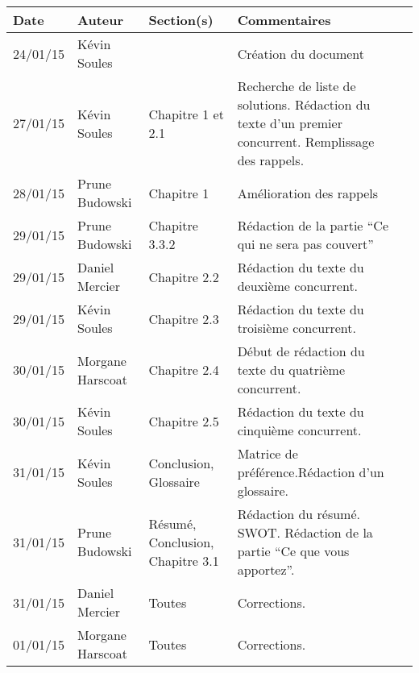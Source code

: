\small
\begin{tabular}{|p{1.5cm}|l|p{2.5cm}|p{7.8cm}|l|}
  \hline
 
   \rowcolor{Gainsboro}Date  & Auteur & Section(s) & Commentaires \\
  \hline
24/01/15 & Kévin Soules &  & Création du document\\
  \hline
27/01/15 & Kévin Soules & Chapitre 1 et 2.1 & Recherche de liste de solutions. Rédaction du texte d'un premier concurrent. Remplissage des rappels.\\
\hline
28/01/15 & Prune Budowski & Chapitre 1 & Amélioration des rappels \\
\hline
29/01/15 & Prune Budowski & Chapitre 3.3.2 & Rédaction de la partie ``Ce qui ne sera pas couvert''\\
\hline
29/01/15 & Daniel Mercier & Chapitre 2.2 & Rédaction du texte du deuxième concurrent.\\
\hline
29/01/15 & Kévin Soules & Chapitre 2.3 & Rédaction du texte du troisième concurrent. \\
\hline
30/01/15 & Morgane Harscoat & Chapitre 2.4 & Début de rédaction du texte du quatrième concurrent. \\
\hline
30/01/15 & Kévin Soules & Chapitre 2.5 & Rédaction du texte du cinquième concurrent.\\
\hline
31/01/15 & Kévin Soules & Conclusion, Glossaire & Matrice de préférence.Rédaction d'un glossaire. \\
\hline
31/01/15 & Prune Budowski & Résumé, Conclusion, Chapitre 3.1 & Rédaction du résumé. SWOT. Rédaction de la partie ``Ce que vous apportez''.  
  \\
\hline
31/01/15 & Daniel Mercier & Toutes & Corrections.
\\
\hline
01/01/15 & Morgane Harscoat & Toutes & Corrections.
\\
  \hline
\end{tabular}
\normalsize
